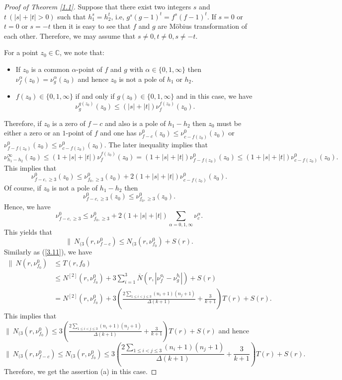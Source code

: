 \documentclass[12pt,leqno]{amsart}
\newcommand{\C}{{\mathbb{C}}}
\numberwithin{equation}{section}
\begin{document}
\begin{proof}[Proof of Theorem \ref{1.1}]
Suppose that there exist two integers $s$ and $t\ (|s|+|t|>0)$ such that $h_1^{s}=h_2^{t}$, i.e, $g^s(g-1)^t=f^s(f-1)^t$. If $s=0$ or $t=0$ or $s=-t$ then it is easy to see that $f$ and $g$ are M\"{o}bius transformation of each other. Therefore, we may assume that $s\ne 0,t\ne 0,s\ne -t$. 

For a point $z_0\in\C$, we note that:
\begin{itemize}
\item If $z_0$ is a common $\alpha$-point of $f$ and $g$  with $\alpha\in\{0,1,\infty\}$ then $\nu^\alpha_f(z_0)=\nu^\alpha_g(z_0)$ and hence $z_0$ is not a pole of $h_1$ or $h_2$. 

\item $f(z_0)\in\{0,1,\infty\}$ if and only if $g(z_0)\in\{0,1,\infty\}$ and in this case, we have $$\nu^{g(z_0)}_g(z_0)\le (|s|+|t|)\nu^{f(z_0)}_f(z_0).$$
\end{itemize}
Therefore, if $z_0$ is a zero of $f-c$ and also is a pole of $h_1-h_2$ then $z_0$ must be either a zero or an $1$-point of $f$ and one has $\nu^0_{f-c}(z_0)\le\nu^0_{c-f(z_0)}(z_0)$ or $\nu^0_{f-f(z_0)}(z_0)\le\nu^0_{c-f(z_0)}(z_0)$. The later inequality implies that
$$\nu^\infty_{h_1-h_2}(z_0)\le (1+|s|+|t|)\nu^{f(z_0)}_f(z_0)=(1+|s|+|t|)\nu^{0}_{f-f(z_0)}(z_0)\le (1+|s|+|t|)\nu^{0}_{c-f(z_0)}(z_0).$$
This implies that
$$\nu^0_{f-c,\ge 3}(z_0)\le \nu^0_{f_0,\ge 3}(z_0)+2(1+|s|+|t|)\nu^{0}_{c-f(z_0)}(z_0).$$
Of course, if $z_0$ is not a pole of $h_1-h_2$ then $$\nu^0_{f-c,\ge 3}(z_0)\le \nu^0_{f_0,\ge 3}(z_0).$$ 
Hence, we have
$$\nu^0_{f-c,\ge 3}\le \nu^0_{f_0,\ge 3}+2(1+|s|+|t|)\sum_{\alpha=0,1,\infty}\nu^{\alpha}_{c}.$$
This yields that
$$\|\ N_{(3}\left(r,\nu^0_{f-c}\right)\le N_{(3}\left(r,\nu^0_{f_0}\right)+S(r).$$
Similarly as (\ref{3.11}), we have 
\begin{align*}
\|\ N(r,\nu^0_{f_0})&\le T(r,f_0)\\
&\le N^{[2]}\left(r,\nu^0_{f_0}\right)+3\sum_{i=1}^3\overline N\left(r,|\nu^{a_i}_f-\nu^{b_i}_g|\right)+S(r)\\
&=N^{[2]}\left(r,\nu^0_{f_0}\right)+3\left(\frac{2\sum_{1\le i<j\le 3}(n_i+1)(n_j+1)}{\Delta(k+1)}+\frac{3}{k+1}\right)T(r) +S(r).
\end{align*}
This implies that $\|\ N_{(3}\left(r,\nu^0_{f_0}\right)\le 3\left(\frac{2\sum_{1\le i<j\le 3}(n_i+1)(n_j+1)}{\Delta(k+1)}+\frac{3}{k+1}\right)T(r) +S(r)$ and hence
$$\|\ N_{(3}\left(r,\nu^0_{f-c}\right)\le N_{(3}\left(r,\nu^0_{f_0}\right)\le 3\left(\frac{2\sum_{1\le i<j\le 3}(n_i+1)(n_j+1)}{\Delta(k+1)}+\frac{3}{k+1}\right)T(r) +S(r).$$
Therefore, we get the assertion (a) in this case.


\end{proof}
\end{document}
